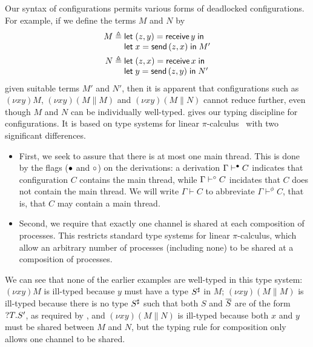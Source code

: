 \documentclass[orivec,envcountsame]{llncs}
\begin{document}
Our syntax of configurations permits various forms of deadlocked configurations.  For example, if we
define the terms $M$ and $N$ by
\begin{align*}
  M &\defeq \bl
    \gvlet{(z,y)}{\gvreceive{y}}{} \\
    \gvlet{x}{\gvsend{(z,x)}}{M'} \el \\
  N &\defeq \bl
    \gvlet{(z,x)}{\gvreceive{x}}{} \\
    \gvlet{y}{\gvsend{(z,y)}}{N'} \el
\end{align*}
given suitable terms $M'$ and $N'$, then it is apparent that configurations such as $(\nu xy)M$,
$(\nu xy)(M \parallel M)$ and $(\nu xy)(M \parallel N)$ cannot reduce further, even though $M$ and
$N$ can be individually well-typed.   gives our typing discipline for
configurations.  It is based on type systems for linear $\pi$-calculus~\cite{} with two significant
differences.
\begin{itemize}
\item First, we seek to assure that there is at most one main thread.  This is done by the flags
  (${\mathord{\bullet}}$ and ${\mathord{\circ}}$) on the derivations: a derivation $\Gamma \vdash^{\mathord{\bullet}} C$ indicates that
  configuration $C$ contains the main thread, while $\Gamma \vdash^{\mathord{\circ}} C$ incidates that $C$ does
  not contain the main thread.  We will write $\Gamma \vdash C$ to abbreviate $\Gamma \vdash^\phi
  C$, that is, that $C$ may contain a main thread.
\item Second, we require that exactly one channel is shared at each composition of processes.  This
  restricts standard type systems for linear $\pi$-calculus, which allow an arbitrary number of
  processes (including none) to be shared at a composition of processes.
\end{itemize}
We can see that none of the earlier examples are well-typed in this type system: $(\nu xy)M$ is
ill-typed because $y$ must have a type $S^\sharp$ in $M$; $(\nu xy)(M \parallel M)$ is ill-typed
because there is no type $S^\sharp$ such that both $S$ and $\overline{S}$ are of the form
${?T.S'}$, as required by , and $(\nu xy)(M \parallel N)$ is ill-typed because
both $x$ and $y$ must be shared between $M$ and $N$, but the typing rule for composition only allows
one channel to be shared.
\end{document}

